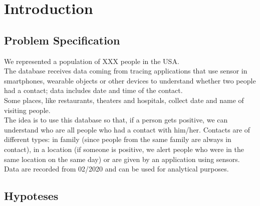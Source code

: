 \documentclass[12pt, a4paper]{article}
\begin{document}
\clearpage

\tableofcontents

\listoftodos

\clearpage

\section{Introduction}

\subsection{Problem Specification}

We represented a population of XXX  people in 
the USA. \\
The database receives data coming from tracing applications that use sensor in 
smartphones, wearable objects or other devices to understand whether two people 
had a contact; data includes date and time of the contact. \\  
Some places, like restaurants, theaters and hospitals, collect date and name of 
visiting people. \\
The idea is to use this database so that, if a person gets positive, we can 
understand who are all people who had a contact with him/her. Contacts are of 
different types: in family (since people from the same family are always in 
contact), in a location (if someone is positive, we alert people who were in 
the same location on the same day) or are given by an application using sensors. 
Data are recorded from 02/2020 and can be used for analytical purposes. 

\subsection{Hypoteses}
\end{document}
